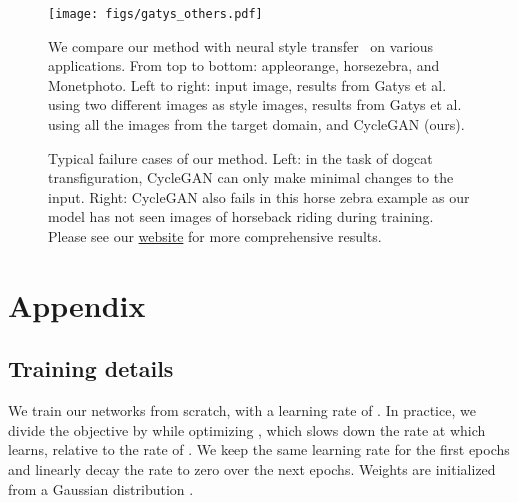\documentclass[10pt,twocolumn,letterpaper]{article}
\newcommand{\lblfig}[1]{\label{fig:#1}}
\newcommand{\lblsec}[1]{\label{sec:#1}}
\begin{document}
\begin{figure*}[t]
\begin{center}
\texttt{[image: figs/gatys\_others.pdf]}
\end{center}
 \vspace{-4 mm}
 \caption{We compare our method with neural style transfer~\cite{gatys2015neural} on various applications. From top to bottom:  appleorange, horsezebra, and Monetphoto. Left to right: input image, results from Gatys et al.~\cite{gatys2015neural} using two different images as style images, results from Gatys et al.~\cite{gatys2015neural} using all the images from the target domain, and CycleGAN (ours).} 
\lblfig{gatys_others}
 \vspace{-4 mm}
\end{figure*}


\begin{figure*}[t]
\begin{center}
  \centering
{} 

\end{center}
 \vspace{-4 mm}
 \caption{Typical failure cases of our method. Left: in the task of dogcat transfiguration, CycleGAN can only make minimal changes to the input.
 Right: CycleGAN also fails in this horse  zebra example as our model has not seen images of horseback riding during training.
 Please see our \href{https://junyanz.github.io/CycleGAN/}{website} for more  comprehensive results.}
  \vspace{-2 mm}
\lblfig{failure}
\end{figure*}

 
\clearpage



\clearpage 
\section{Appendix}
\lblsec{appendix}


\subsection{Training details}
We train our networks from scratch,  with a learning rate of . In practice, we divide the objective by  while optimizing , which slows down the rate at which  learns, relative to the rate of . We keep the same learning rate for the first  epochs and linearly decay the rate to zero over the next  epochs. Weights are initialized from a Gaussian distribution .
\end{document}
